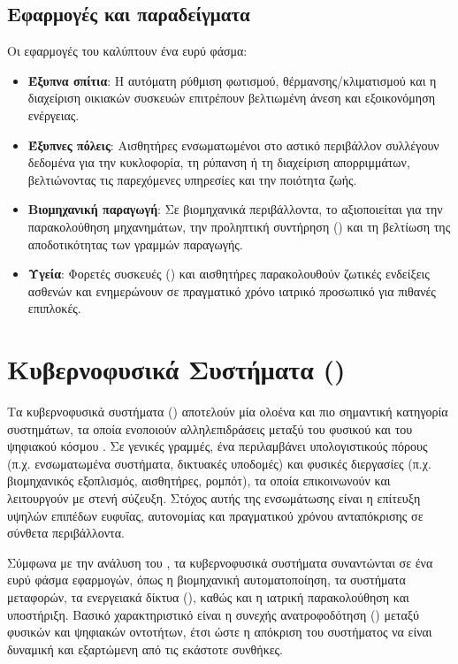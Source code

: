 \subsection{Εφαρμογές και παραδείγματα}

Οι εφαρμογές του  καλύπτουν ένα ευρύ φάσμα:
\begin{itemize}
  \item \textbf{Έξυπνα σπίτια}: Η αυτόματη ρύθμιση φωτισμού, θέρμανσης/κλιματισμού και η διαχείριση οικιακών συσκευών επιτρέπουν βελτιωμένη άνεση και εξοικονόμηση ενέργειας.
  \item \textbf{Έξυπνες πόλεις}: Αισθητήρες ενσωματωμένοι στο αστικό περιβάλλον συλλέγουν δεδομένα για την κυκλοφορία, τη ρύπανση ή τη διαχείριση απορριμμάτων, βελτιώνοντας τις παρεχόμενες υπηρεσίες και την ποιότητα ζωής.
  \item \textbf{Βιομηχανική παραγωγή}: Σε βιομηχανικά περιβάλλοντα, το  αξιοποιείται για την παρακολούθηση μηχανημάτων, την προληπτική συντήρηση () και τη βελτίωση της αποδοτικότητας των γραμμών παραγωγής.
  \item \textbf{Υγεία}: Φορετές συσκευές () και αισθητήρες παρακολουθούν ζωτικές ενδείξεις ασθενών και ενημερώνουν σε πραγματικό χρόνο ιατρικό προσωπικό για πιθανές επιπλοκές.
\end{itemize}

\section{Κυβερνοφυσικά Συστήματα ()}

Τα κυβερνοφυσικά συστήματα () αποτελούν μία ολοένα και πιο σημαντική κατηγορία
συστημάτων, τα οποία ενοποιούν αλληλεπιδράσεις μεταξύ του φυσικού και του ψηφιακού
κόσμου \cite{Lee2008, Rajkumar2010, Baheti2011}. Σε γενικές γραμμές, ένα  
περιλαμβάνει υπολογιστικούς πόρους (π.χ. ενσωματωμένα συστήματα, δικτυακές υποδομές) 
και φυσικές διεργασίες (π.χ. βιομηχανικός εξοπλισμός, αισθητήρες, ρομπότ), τα οποία 
επικοινωνούν και λειτουργούν με στενή σύζευξη. Στόχος αυτής της ενσωμάτωσης είναι η 
επίτευξη υψηλών επιπέδων ευφυΐας, αυτονομίας και πραγματικού χρόνου ανταπόκρισης 
σε σύνθετα περιβάλλοντα.

Σύμφωνα με την ανάλυση του  \cite{Lee2008}, τα κυβερνοφυσικά συστήματα συναντώνται
σε ένα ευρύ φάσμα εφαρμογών, όπως η βιομηχανική αυτοματοποίηση, τα συστήματα μεταφορών,
τα ενεργειακά δίκτυα (), καθώς και η ιατρική παρακολούθηση και υποστήριξη.
Βασικό χαρακτηριστικό είναι η συνεχής ανατροφοδότηση () μεταξύ φυσικών 
και ψηφιακών οντοτήτων, έτσι ώστε η απόκριση του συστήματος να είναι δυναμική και
εξαρτώμενη από τις εκάστοτε συνθήκες.

